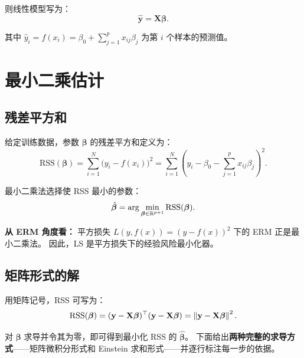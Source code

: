 则线性模型写为：
\begin{equation}\label{eq:linear_model_matrix}
    \hat{\mathbf{y}} = \mathbf{X} \bm{\beta}.
\end{equation}

其中 $\hat{y}_i = f(x_i) = \beta_0 + \sum_{j=1}^{p} x_{ij} \beta_j$ 为第 $i$ 个样本的预测值。

\section{最小二乘估计}

\subsection{残差平方和}

\begin{definition}
给定训练数据，参数 $\bm{\beta}$ 的残差平方和定义为：
\begin{equation}\label{eq:rss}
    \mathrm{RSS}(\bm{\beta})
    = \sum_{i=1}^{N} \big(y_i - f(x_i)\big)^2
    = \sum_{i=1}^{N} \left(y_i - \beta_0 - \sum_{j=1}^{p} x_{ij} \beta_j\right)^2.
\end{equation}
\end{definition}

\begin{definition}
最小二乘法选择使 RSS 最小的参数：
\begin{equation}\label{eq:ls_estimator}
    \hat{\bm{\beta}} = \arg\min_{\bm{\beta} \in \mathbb{R}^{p+1}} \mathrm{RSS}(\bm{\beta}).
\end{equation}
\end{definition}

\textbf{从 ERM 角度看：} 平方损失 $L(y, f(x)) = (y - f(x))^2$ 下的 ERM 正是最小二乘法。
因此，LS 是平方损失下的经验风险最小化器。

\subsection{矩阵形式的解}

用矩阵记号，RSS 可写为：
\begin{equation}\label{eq:rss_matrix}
    \mathrm{RSS}(\bm{\beta}) = (\mathbf{y} - \mathbf{X}\bm{\beta})^\top (\mathbf{y} - \mathbf{X}\bm{\beta})
    = \left\lVert\mathbf{y} - \mathbf{X}\bm{\beta}\right\rVert^2.
\end{equation}

对 $\bm{\beta}$ 求导并令其为零，即可得到最小化 RSS 的 $\hat{\bm{\beta}}$。
下面给出\textbf{两种完整的求导方式}——矩阵微积分形式和 Einstein 求和形式——并逐行标注每一步的依据。

